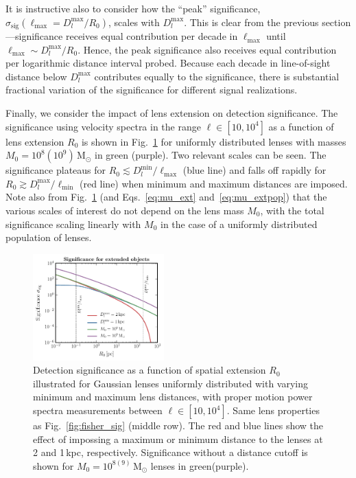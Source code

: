 \documentclass[prd,aps,twocolumn,nofootinbib,superscriptaddress,preprintnumbers,balancelastpage,longbibliography,floatfix]{revtex4-1}
\begin{document}
It is instructive also to consider how the ``peak'' significance, $\sigma_\mathrm{sig}(\ell_\mathrm{max} = D_l^\mathrm{max}/R_0)$, scales with $D_l^\mathrm{max}$. This is clear from the previous section---significance receives equal contribution per decade in $\ell_\mathrm{max}$ until $\ell_\mathrm{max} \sim D_l^\mathrm{max}/R_0$. Hence, the peak significance also receives equal contribution per logarithmic distance interval probed. Because each decade in line-of-sight distance below $D_l^\mathrm{max}$ contributes equally to the significance, there is substantial fractional variation of the significance for different signal realizations.

Finally, we consider the impact of lens extension on detection significance. The significance using velocity spectra in the range $\ell \in [10, 10^4]$ as a function of lens extension $R_0$ is shown in Fig.~\ref{fig:sig_R0} for uniformly distributed lenses with masses $M_0 = 10^{8}(10^{9})\,\mathrm{M}_\odot$ in green (purple). Two relevant scales can be seen. The significance plateaus for $R_0 \lesssim D_l^\mathrm{min}/\ell_\mathrm{max}$ (blue line) and falls off rapidly for $R_0 \gtrsim D_l^\mathrm{max}/\ell_\mathrm{min}$ (red line) when minimum and maximum distances are imposed. Note also from Fig.~\ref{fig:sig_R0} (and Eqs.~\eqref{eq:mu_ext} and~\eqref{eq:mu_extpop}) that the various scales of interest do not depend on the lens mass $M_0$, with the total significance scaling linearly with $M_0$ in the case of a uniformly distributed population of lenses.

\begin{figure}[htbp]
\centering
\includegraphics[width=0.45\textwidth]{plots/sig_R0.pdf}
\caption{Detection significance as a function of spatial extension $R_0$ illustrated for Gaussian lenses uniformly distributed with varying minimum and maximum lens distances, with proper motion power spectra measurements between $\ell \in [10, 10^4]$. Same lens properties as Fig.~\ref{fig:fisher_sig} (middle row). The red and blue lines show the effect of impossing a maximum or minimum distance to the lenses at 2 and 1\,kpc, respectively. Significance without a distance cutoff is shown for $M_0 = 10^{8(9)}\,\mathrm{M}_\odot$ lenses in green(purple). } 
\label{fig:sig_R0}
\end{figure}{}
\end{document}
